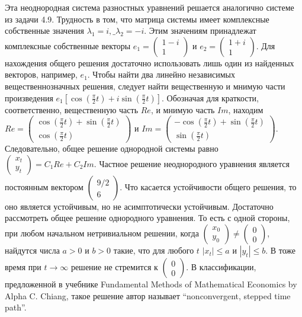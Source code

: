 \begin{solution}
Эта неоднородная система разностных уравнений решается  аналогично системе из задачи 4.9. Трудность в том, что матрица системы имеет комплексные собственные значения $\lambda _{1} =i,\_ \lambda _{2} =-i$. Этим значениям принадлежат комплексные собственные векторы $e_{1} =\left(\begin{array}{c} {1-i} \\ {1} \end{array}\right)$ и $e_{2} =\left(\begin{array}{c} {1+i} \\ {1} \end{array}\right)$. Для нахождения общего решения достаточно использовать лишь один из найденных векторов, например, $e_{1} $. Чтобы найти два линейно независимых вещественнозначных решения, следует найти вещественную и мнимую части произведения $e_{1} \left[\cos (\frac{\pi }{2} t)+i\sin (\frac{\pi }{2} t)\right]$. Обозначая для краткости, соответственно, вещественную часть $Re$, и мнимую часть $Im$, находим $Re=\left(\begin{array}{c} {\cos (\frac{\pi }{2} t)+\sin (\frac{\pi }{2} t)} \\ {\cos (\frac{\pi }{2} t)} \end{array}\right)$ и $Im=\left(\begin{array}{c} {-\cos (\frac{\pi }{2} t)+\sin (\frac{\pi }{2} t)} \\ {\sin (\frac{\pi }{2} t)} \end{array}\right)$. Следовательно, общее решение однородной системы равно $\left(\begin{array}{c} {x_{t} } \\ {y_{t} } \end{array}\right)=C_{1} Re+C_{2} Im$. Частное решение неоднородного уравнения является постоянным вектором $\left(\begin{array}{c} {9/2} \\ {6} \end{array}\right)$.  Что касается устойчивости общего решения, то оно является устойчивым, но не асимптотически устойчивым.  Достаточно рассмотреть общее решение однородного уравнения. То есть с одной стороны, при любом начальном нетривиальном решении, когда $\left(\begin{array}{c} {x_{0} } \\ {y_{0} } \end{array}\right)\ne \left(\begin{array}{c} {0} \\ {0} \end{array}\right)$, найдутся числа $a>0$ и $b>0$ такие, что  для любого $t$ $\left|x_{t} \right|\le a$ и $\left|y_{t} \right|\le b$. В тоже время при $t\to \infty $ решение не стремится к $\left(\begin{array}{c} {0} \\ {0} \end{array}\right)$. В классификации, предложенной в учебнике Fundamental Methods of Mathematical Economics by Alpha C. Chiang, такое решение автор называет ``nonconvergent, stepped time path''.
\end{solution}
